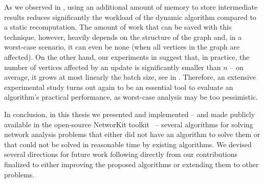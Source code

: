 As we observed in , using an additional amount of memory to
store intermediate results reduces significantly the workload of the dynamic
algorithm compared to a static recomputation. The amount of work that can
be saved with this technique, however, heavily depends on the structure of the
graph and, in a worst-case scenario, it can even be none (when all vertices in
%
the graph are affected).
On the other hand, our experiments in  suggest
that, in practice, the number of vertices affected by an update is significantly smaller
than $n$ -- on average, it grows at most linearly \wrt the batch size, see
 in
.
Therefore, an extensive experimental study turns out again to be an essential
tool to evaluate an algorithm's practical performance, as worst-case analysis
may be too pessimistic.

\vspace{\baselineskip}


In conclusion, in this thesis we presented and implemented
-- and made publicly available in the open-source NetworKit
toolkit~\cite{DBLP:journals/netsci/StaudtSM16} -- several
algorithms for solving network analysis problems that either did not have
an algorithm to solve them or that could not be solved in reasonable time by
existing algorithms.
We devised several directions for future work following directly from our
contributions finalized to either improving the proposed algorithms
or extending them to other problems.

